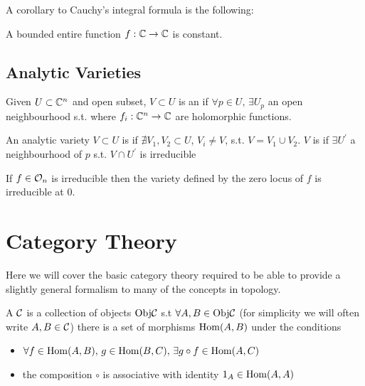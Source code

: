 \documentclass{article}
\begin{document}
A corollary to Cauchy's integral formula is the following:

\begin{theorem}[Liouville]
	A bounded entire function $f:\mathbb{C} \to \mathbb{C}$ is constant. 
\end{theorem}
\subsection{Analytic Varieties}

\begin{definition}
	Given $U \subset \mathbb{C}^n$ and open subset, $V \subset U$ is an  if $\forall p \in U, \, \exists U_p$ an open neighbourhood s.t. 
where $f_i : \mathbb{C}^n \to \mathbb{C}$ are holomorphic functions. 
\end{definition}

\begin{definition}
	An analytic variety $V \subset U$ is  if $\nexists V_1, V_2 \subset U$, $V_i \neq V$, s.t. $V = V_1 \cup V_2$. $V$ is  if $\exists U^\prime$ a neighbourhood of $p$ s.t. $V\cap U^\prime$ is irreducible  
\end{definition}

\begin{prop}
	If $f \in \mathcal{O}_n$ is irreducible then the variety defined by the zero locus of $f$ is irreducible at 0.
\end{prop}


\section{Category Theory}
Here we will cover the basic category theory required to be able to provide a slightly general formalism to many of the concepts in topology. 

\begin{definition}
	A  $\mathcal{C}$ is a collection of objects $\text{Obj}\mathcal{C}$ s.t $\forall A,B \in  \text{Obj}\mathcal{C}$ (for simplicity we will often write $A,B \in \mathcal{C}$) there is a set of morphisms $\operatorname{Hom}(A,B)$ under the conditions
	\begin{itemize}
		\item $\forall f \in \operatorname{Hom}(A,B), \, g \in \operatorname{Hom}(B,C), \, \exists g \circ f \in \operatorname{Hom}(A,C)$
		\item the composition $\circ$ is associative with identity $1_A \in \operatorname{Hom}(A,A)$
	\end{itemize}
\end{definition}
\end{document}
